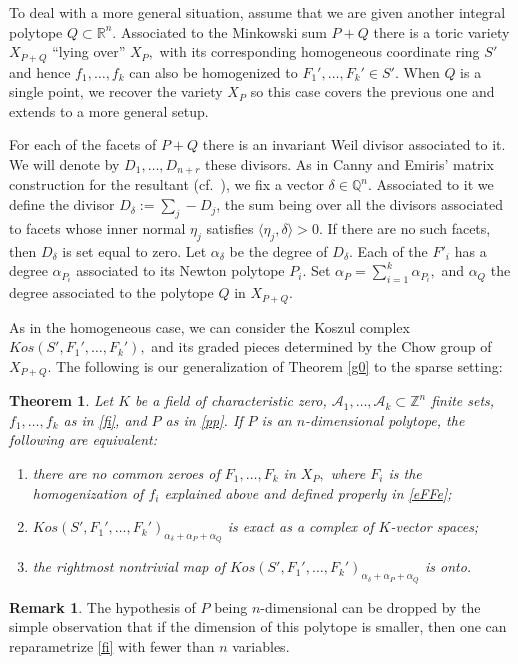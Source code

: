 \documentclass[a4paper,11pt]{amsart}
\newcommand{\Q}{\mathbb{Q}}
\newcommand{\R}{\mathbb{R}}
\newcommand{\Z}{\mathbb{Z}}
\newcommand{\cA}{{\mathcal A}}
\newcounter{thm}
\numberwithin{thm}{section}
\numberwithin{equation}{section}
\theoremstyle{definition}
\newtheorem{remark}[thm]{Remark}
\theoremstyle{plain}
\newtheorem{theorem}[thm]{Theorem}
\begin{document}
To deal with a more general situation, assume that we are given another integral polytope $Q\subset\R^n.$ Associated to the Minkowski sum $P+Q$ there is a toric variety $X_{P+Q}$ ``lying over'' $X_P,$ with its corresponding homogeneous coordinate ring $S'$ and hence $f_1,\ldots, f_k$ can also be homogenized to $F_1',\ldots, F_k'\in S'.$ When $Q$ is a single point, we recover the variety $X_P$ so this case covers the previous one and extends to a more general setup.


For each of the facets of $P+Q$ there is an invariant Weil divisor associated to it. We will denote by $D_1,\ldots, D_{n+r}$ these divisors.
As in Canny and Emiris' matrix construction for the resultant (cf.~\cite{CE93}), we fix a vector $\delta\in\Q^n.$ Associated to it we define the divisor $D_\delta:=\sum_j -D_j$, the sum being over all the divisors associated to facets whose inner normal $\eta_j$ satisfies $\langle \eta_j,\delta\rangle>0.$ If there are no such facets, then $D_\delta$ is set equal to zero.
Let $\alpha_\delta$ be the degree of $D_\delta.$   Each of the $F'_i$  has a degree $\alpha_{P_i}$ associated to its Newton polytope $P_i.$
Set $\alpha_P=\sum_{i=1}^k \alpha_{P_i},$ and $\alpha_Q$ the degree associated to the polytope $Q$ in $X_{P+Q}.$

As in the homogeneous case, we can consider the Koszul complex $Kos(S',F_1',\ldots, F_k'),$ and its graded pieces determined by the Chow group of $X_{P+Q}.$
The following is our generalization of Theorem \ref{g0} to the sparse setting:
\begin{theorem}\label{g1}
Let $K$ be a field of characteristic zero,  $\cA_1,\ldots, \cA_{k}\subset\Z^n$ finite sets, $f_1,\ldots, f_k$ as in \eqref{fi}, and $P$ as in \eqref{pp}. If $P$ is an $n$-dimensional polytope,  the following are equivalent:
\begin{enumerate}
\item there are no common zeroes of $F_1,\ldots, F_k$ in $X_P,$ where $F_i$ is the homogenization of $f_i$ explained above and defined properly in \eqref{eFFe};
\item $Kos(S',F_1',\ldots, F_k')_{\alpha_\delta+\alpha_P+\alpha_Q}$ is exact as a complex of $K$-vector spaces;
\item the rightmost nontrivial map of $Kos(S',F_1',\ldots, F_k')_{\alpha_\delta+\alpha_P+\alpha_Q}$ is onto.
\end{enumerate}
\end{theorem}

\begin{remark}
The hypothesis of $P$ being $n$-dimensional can be dropped by the simple observation that if the dimension of this polytope is smaller, then one can reparametrize \eqref{fi} with fewer than $n$ variables.
\end{remark}
\end{document}
